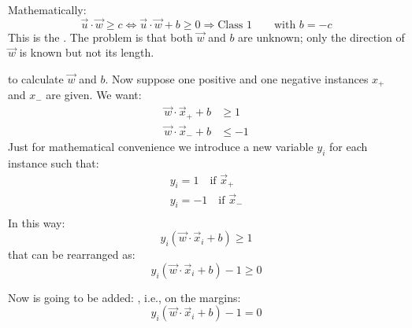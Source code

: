 Mathematically:
\begin{equation}
\vec{u}\cdot \vec{w} \ge c \Leftrightarrow \vec{u}\cdot \vec{w} + b \ge0\Rightarrow \text{Class } 1 \quad\quad \text{with } b=-c
\end{equation}
This is the . The problem is that both $\vec{w}$ and $b$ are unknown; only the direction of $\vec{w}$ is known but not its length.

 to calculate $\vec{w}$ and $b$. Now suppose one positive and one negative instances $x_+$ and $x_-$ are given. We want:
\begin{equation}
\begin{aligned}
\vec{w} \cdot \vec{x}_+ + b &\ge 1\\
\vec{w} \cdot \vec{x}_- + b &\le -1
\end{aligned}
\end{equation}
Just for mathematical convenience we introduce a new variable $y_i$ for each instance such that:
\begin{equation}
\begin{aligned}
y_i = 1 \quad \text{if } \vec{x}_+\\
y_i = -1 \quad \text{if } \vec{x}_-\\ 
\end{aligned}
\end{equation}
In this way:
\begin{equation}
y_i (\vec{w}\cdot \vec{x}_i + b) \ge 1
\end{equation}
that can be rearranged as:
\begin{equation}
y_i (\vec{w}\cdot \vec{x}_i + b) -1 \ge 0
\end{equation}

Now  is going to be added: , i.e., on the margins:
\begin{equation}
y_i (\vec{w}\cdot \vec{x}_i + b) -1 = 0
\label{SVMmargin}
\end{equation}

